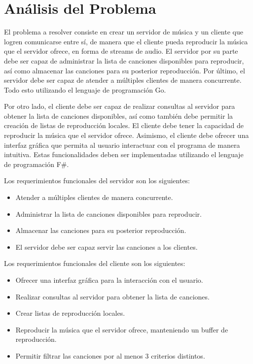 \section{Análisis del Problema}

El problema a resolver consiste en crear un servidor de música y un cliente 
que logren comunicarse entre sí, de manera que el cliente pueda reproducir
la música que el servidor ofrece, en forma de streams de audio. El servidor 
por su parte debe ser capaz de administrar la lista de canciones disponibles
para reproducir, así como almacenar las canciones para su posterior
reproducción. Por último, el servidor debe ser capaz de atender a múltiples
clientes de manera concurrente. Todo esto utilizando el lenguaje de programación
Go.

Por otro lado, el cliente debe ser capaz de realizar consultas al servidor para
obtener la lista de canciones disponibles, así como también debe permitir la
creación de listas de reproducción locales. El cliente debe tener la capacidad
de reproducir la música que el servidor ofrece. Asimismo, el cliente debe 
ofrecer una interfaz gráfica que permita al usuario interactuar con el
programa de manera intuitiva. Estas funcionalidades deben ser implementadas
utilizando el lenguaje de programación F\#.

Los requerimientos funcionales del servidor son los siguientes:

\begin{itemize}
    \item Atender a múltiples clientes de manera concurrente.
    \item Administrar la lista de canciones disponibles para reproducir.
    \item Almacenar las canciones para su posterior reproducción.
    \item El servidor debe ser capaz servir las canciones a los clientes.
\end{itemize}

Los requerimientos funcionales del cliente son los siguientes:

\begin{itemize}
    \item Ofrecer una interfaz gráfica para la interacción con el usuario.
    \item Realizar consultas al servidor para obtener la lista de canciones.
    \item Crear listas de reproducción locales.
    \item Reproducir la música que el servidor ofrece, manteniendo un buffer 
    de reproducción.
    \item Permitir filtrar las canciones por al menos 3 criterios distintos.
\end{itemize}

